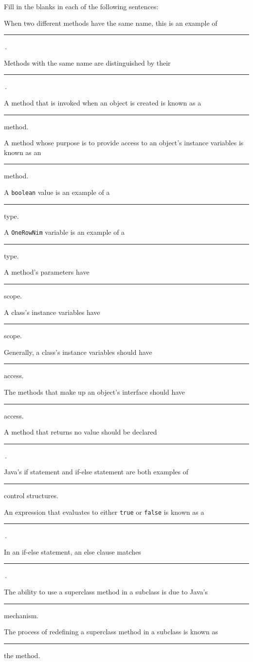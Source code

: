 \label{exercises}
\begin{EXRtwo}
\item  Fill in the blanks in each of the following sentences:

\begin{EXRtwoLL}
\baselineskip=14pt\item  When two different methods have the same name, this is
an example of \rule{30pt}{0.5pt}\,.
\item  Methods with the same name are distinguished by their
\rule{30pt}{0.5pt}\,.


\item  A method that is invoked when an object is created is
known as a \rule{30pt}{0.5pt} method.
\item  A method whose purpose is to provide access to an object's
instance variables is known as an \rule{30pt}{0.5pt} method.
\item  A {\tt boolean} value is an example of a \rule{30pt}{0.5pt} type.
\item  A {\tt OneRowNim} variable is an example of a \rule{30pt}{0.5pt} type.
\item  A method's parameters have \rule{30pt}{0.5pt} scope.
\item  A class's instance variables have \rule{30pt}{0.5pt} scope.
\item  Generally, a class's instance variables should have
\rule{30pt}{0.5pt} access.
\item  The methods that make up an object's interface should have
\rule{30pt}{0.5pt} access.
\item  A method that returns no value should be declared  \rule{30pt}{0.5pt}\,.
\item  Java's if statement and if-else statement are both examples of
\rule{30pt}{0.5pt}
control structures.
\item  An expression that evaluates to either {\tt true} or {\tt false} is
known as a  \rule{30pt}{0.5pt}\,.
\item  In an if-else statement, an else clause matches  \rule{30pt}{0.5pt}\,.
\item  The ability to use a superclass method in a subclass is due to Java's
  \rule{30pt}{0.5pt} mechanism.
\item  The process of redefining a superclass method in a subclass is
known as  \rule{30pt}{0.5pt} the method.
\end{EXRtwoLL}


\end{EXRtwo}

